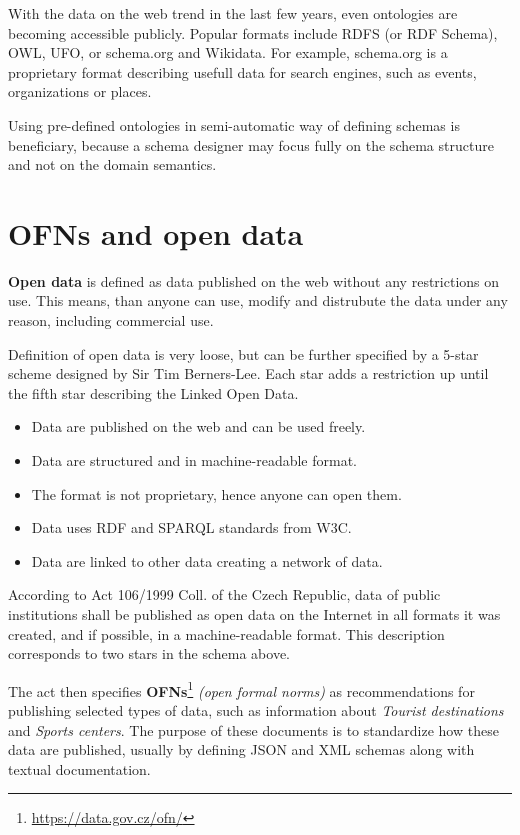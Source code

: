 With the data on the web \cite{data-on-the-web} trend in the last few years, even ontologies are becoming accessible publicly. Popular formats include RDFS (or RDF Schema), OWL, UFO, or schema.org and Wikidata. For example, schema.org is a proprietary format describing usefull data for search engines, such as events, organizations or places.

Using pre-defined ontologies in semi-automatic way of defining schemas is beneficiary, because a schema designer may focus fully on the schema structure and not on the domain semantics.

\section*{OFNs and open data}

\textbf{Open data} is defined as data published on the web without any restrictions on use. This means, than anyone can use, modify and distrubute the data under any reason, including commercial use.

Definition of open data is very loose, but can be further specified by a 5-star scheme designed by Sir Tim Berners-Lee. Each star adds a restriction up until the fifth star describing the Linked Open Data.
\begin{itemize}[noitemsep,leftmargin=2cm]
    \item [1 $\bigstar$] Data are published on the web and can be used freely.
    \item [2 $\bigstar$] Data are structured and in machine-readable format.
    \item [3 $\bigstar$] The format is not proprietary, hence anyone can open them.
    \item [4 $\bigstar$] Data uses RDF and SPARQL standards from W3C.
    \item [5 $\bigstar$] Data are linked to other data creating a network of data.
\end{itemize}

\smallskip

According to Act 106/1999 Coll. of the Czech Republic, data of public institutions shall be published as open data on the Internet in all formats it was created, and if possible, in a machine-readable format. This description corresponds to two stars in the schema above.

The act then specifies \textbf{OFNs}\footnote{\url{https://data.gov.cz/ofn/}} \textit{(open formal norms)} as recommendations for publishing selected types of data, such as information about \textit{Tourist destinations} and \textit{Sports centers}. The purpose of these documents is to standardize how these data are published, usually by defining JSON and XML schemas along with textual documentation.

